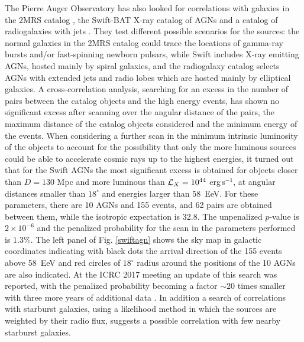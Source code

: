 \documentclass[twoside,12pt]{article}
\begin{document}
The Pierre Auger Observatory has also looked for correlations with galaxies in the 2MRS catalog \cite{hu12}, the Swift-BAT X-ray catalog of AGNs \cite{ba13} and a catalog of radiogalaxies with jets \cite{va12}. They test different possible scenarios for the sources: the normal galaxies in the 2MRS catalog could trace the locations of gamma-ray bursts and/or fast-spinning newborn pulsars, while Swift includes X-ray emitting AGNs, hosted mainly by spiral galaxies, and the radiogalaxy catalog selects AGNs with extended jets and radio lobes which are hosted mainly by elliptical galaxies. A cross-correlation analysis, searching for an excess in the number of pairs between the catalog objects and the high energy events, has shown no significant excess after scanning over the angular distance of the pairs, the maximum distance of the catalog objects considered and the minimum energy of the events. When considering a further scan in the minimum intrinsic luminosity of the objects to account for the possibility that only the more luminous sources could be able to accelerate cosmic rays up to the highest energies, it turned out that for the Swift AGNs the most significant excess is obtained for objects closer than $D = 130$ Mpc and more luminous than ${\cal L}_X  = 10^{44}$ erg\,s$^{-1}$, at angular distances smaller than $18^\circ$ and energies larger than $58$~EeV. For these parameters, there are 10 AGNs and 155 events, and 62 pairs are obtained between them, while the isotropic expectation is 32.8. The unpenalized $p$-value is $2 \times 10^{-6}$  and the penalized probability for the scan in the parameters performed is $1.3\%$. The left panel of Fig. \ref{swiftagn} shows the sky map in galactic coordinates indicating with black dots the arrival direction of the 155 events above 58~EeV and red circles of $18^\circ$ radius around the positions of the 10 AGNs are also indicated.
 At the ICRC 2017 meeting an update of this search was reported, with the penalized probability becoming a factor $\sim 20$ times smaller with three more years of additional data \cite{icrc17ugo}. In addition a search of correlations with starburst galaxies, using a likelihood method in which the sources are weighted by their radio flux, suggests a possible correlation with few nearby starburst galaxies.
\end{document}
